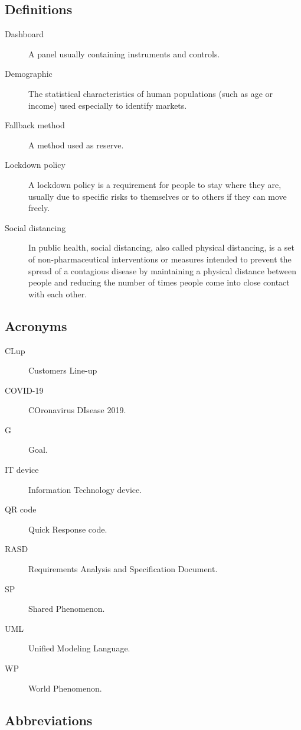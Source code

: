\documentclass[../../main.tex]{subfiles}
\begin{document}
\subsection{Definitions}

\begin{description}
    
    \item[Dashboard] A panel usually containing instruments and controls.
    
    \item[Demographic] The statistical characteristics of human populations (such as age or income) used especially to identify markets.
    
    \item[Fallback method] A method used as reserve.

    \item[Lockdown policy] A lockdown policy is a requirement for people to stay where they are, usually due to specific risks to themselves or to others if they can move freely. 

    \item[Social distancing] In public health, social distancing, also called physical distancing,
                             is a set of non-pharmaceutical interventions or measures intended to prevent the spread of a contagious disease by maintaining 
                             a physical distance between people and reducing the number of times people come into close contact with each other.
\end{description}

\subsection{Acronyms}

\begin{description}
    
    \item[CLup] Customers Line-up
    
    \item[COVID-19] COronavirus DIsease 2019.
    
    \item[G] Goal.
    
    \item[IT device] Information Technology device.
    
    \item[QR code] Quick Response code.
    
    \item[RASD] Requirements Analysis and Specification Document.
    
    \item[SP] Shared Phenomenon.
    
    \item[UML] Unified Modeling Language.
    
    \item[WP] World Phenomenon.
\end{description}

\subsection{Abbreviations}
\end{document}
